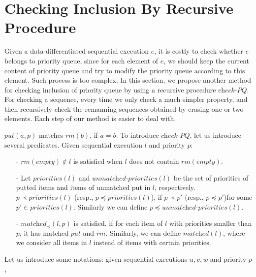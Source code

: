 \section{Checking Inclusion By Recursive Procedure}
\label{sec:checking inclusion by recursive procedure}

Given a data-differentiated sequential execution $e$, it is costly to check whether $e$ belongs to priority queue, since for each element of $e$, we should keep the current content of priority queue and try to modify the priority queue according to this element. Such process is too complex. In this section, we propose another method for checking inclusion of priority queue by using a recursive procedure $\textit{check-PQ}$. For checking a sequence, every time we only check a much simpler property, and then recursively check the remanning sequences obtained by erasing one or two elements. Each step of our method is easier to deal with.

$\textit{put}(a,p)$ matches $\textit{rm}(b)$, if $a = b$. To introduce $\textit{check-PQ}$, let us introduce several predicates. Given sequential execution $l$ and priority $p$:

\begin{itemize}
\setlength{\itemsep}{0.5pt}
\item[-] $\textit{rm}(\textit{empty}) \notin l$ is satisfied when $l$ does not contain $\textit{rm}(\textit{empty})$.

\item[-] Let $\textit{priorities}(l)$ and $\textit{unmatched-priorities}(l)$ be the set of priorities of putted items and items of unmatched put in $l$, respectively. $p \prec \textit{priorities}(l)$ (resp., $p \preceq \textit{priorities}(l)$), if $p \prec p'$ (resp., $p \preceq p'$)for some $p' \in \textit{priorities}(l)$. Similarly we can define $p \preceq \textit{unmatched-priorities}(l)$.

\item[-] $\textit{matched}_{\prec}(l,p)$ is satisfied, if for each item of $l$ with priorities smaller than $p$, it has matched $\textit{put}$ and $\textit{rm}$. Similarly, we can define $\textit{matched}(l)$, where we consider all items in $l$ instead of items with certain priorities.
\end{itemize}

Let us introduce some notations: given sequential executions $u,v,w$ and priority $p$,


